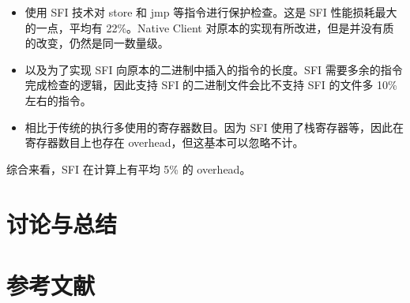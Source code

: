 \documentclass[final,12pt]{elsarticle}
\begin{document}
\begin{itemize}
\item
使用 SFI 技术对 store 和 jmp 等指令进行保护检查。这是 SFI 性能损耗最大的一点，平均有 22\%。Native Client 对原本的实现有所改进，但是并没有质的改变，仍然是同一数量级。
\item
以及为了实现 SFI 向原本的二进制中插入的指令的长度。SFI 需要多余的指令完成检查的逻辑，因此支持 SFI 的二进制文件会比不支持 SFI 的文件多 10\% 左右的指令。
\item
相比于传统的执行多使用的寄存器数目。因为 SFI 使用了栈寄存器等，因此在寄存器数目上也存在 overhead，但这基本可以忽略不计。
\end{itemize}

综合来看，SFI 在计算上有平均 5\% 的 overhead。


\section{讨论与总结}
\label{s:tucao}


\clearpage

\section*{参考文献}





 

\end{document}
